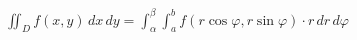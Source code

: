 \documentclass[preview]{standalone}
\begin{document}
\begin{align*}
\iint_D f(x, y) \,dx\,dy = \int_{\alpha}^{\beta} \int_{a}^{b} f(r\cos\varphi, r\sin\varphi) \cdot r \,dr\,d\varphi
\end{align*}
\end{document}
